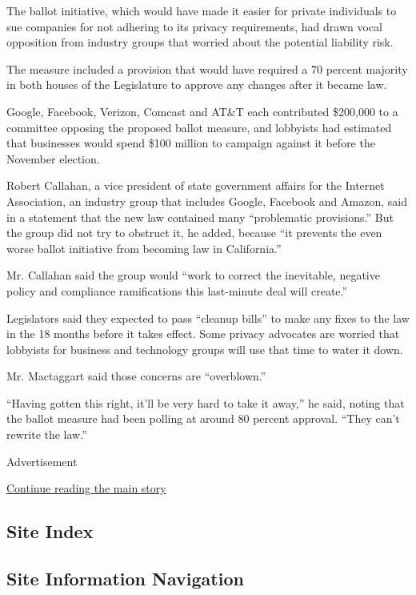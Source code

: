 The ballot initiative, which would have made it easier for private
individuals to sue companies for not adhering to its privacy
requirements, had drawn vocal opposition from industry groups that
worried about the potential liability risk.

The measure included a provision that would have required a 70 percent
majority in both houses of the Legislature to approve any changes after
it became law.

Google, Facebook, Verizon, Comcast and AT\&T each contributed \$200,000
to a committee opposing the proposed ballot measure, and lobbyists had
estimated that businesses would spend \$100 million to campaign against
it before the November election.

Robert Callahan, a vice president of state government affairs for the
Internet Association, an industry group that includes Google, Facebook
and Amazon, said in a statement that the new law contained many
``problematic provisions.'' But the group did not try to obstruct it, he
added, because ``it prevents the even worse ballot initiative from
becoming law in California.''

Mr. Callahan said the group would ``work to correct the inevitable,
negative policy and compliance ramifications this last-minute deal will
create.''

Legislators said they expected to pass ``cleanup bills'' to make any
fixes to the law in the 18 months before it takes effect. Some privacy
advocates are worried that lobbyists for business and technology groups
will use that time to water it down.

Mr. Mactaggart said those concerns are ``overblown.''

``Having gotten this right, it'll be very hard to take it away,'' he
said, noting that the ballot measure had been polling at around 80
percent approval. ``They can't rewrite the law.''

Advertisement

\protect\hyperlink{after-bottom}{Continue reading the main story}

\hypertarget{site-index}{%
\subsection{Site Index}\label{site-index}}

\hypertarget{site-information-navigation}{%
\subsection{Site Information
Navigation}\label{site-information-navigation}}

